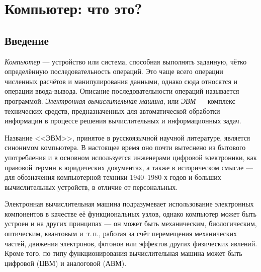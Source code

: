 \section{Компьютер: что это?}\label{base:introduction:computer}
\subsection{Введение}\label{base:introduction:computer:introduction}
\emph{Компьютер} --- устройство или система, способная выполнять заданную, чётко определённую последовательность операций. Это чаще всего операции численных расчётов и манипулирования данными, однако сюда относятся и операции ввода-вывода. Описание последовательности операций называется программой.
\emph{Электронная вычислительная машина}, или \emph{ЭВМ} --- комплекс технических средств, предназначенных для автоматической обработки информации в процессе решения вычислительных и информационных задач.

Название <<ЭВМ>>, принятое в русскоязычной научной литературе, является синонимом компьютера. В настоящее время оно почти вытеснено из бытового употребления и в основном используется инженерами цифровой электроники, как правовой термин в юридических документах, а также в историческом смысле --- для обозначения компьютерной техники 1940--1980-х годов и больших вычислительных устройств, в отличие от персональных.

Электронная вычислительная машина подразумевает использование электронных компонентов в качестве её функциональных узлов, однако компьютер может быть устроен и на других принципах --- он может быть механическим, биологическим, оптическим, квантовым и~т.\,п., работая за счёт перемещения механических частей, движения электронов, фотонов или эффектов других физических явлений. Кроме того, по типу функционирования вычислительная машина может быть цифровой (ЦВМ) и аналоговой (АВМ).

